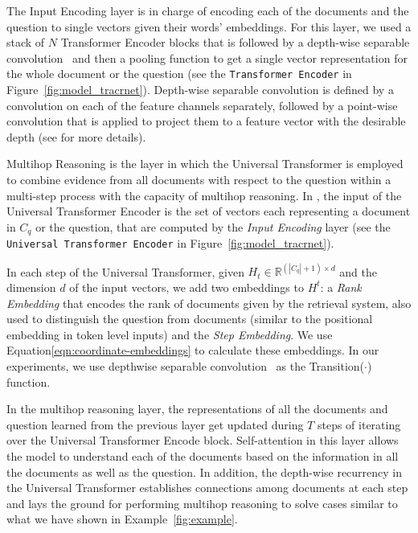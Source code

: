 The Input Encoding layer is in charge of encoding each of the documents and the question to single vectors given their words' embeddings. For this layer, we used a stack of $N$ Transformer Encoder blocks that is followed by a depth-wise separable convolution~\citep{kaiser2017depthwise,chollet2017xception} and then a pooling function to get a single vector representation for the whole document or the question  (see the \texttt{Transformer Encoder} in Figure~\ref{fig:model_tracrnet}). 
Depth-wise separable convolution is defined by a convolution on each of the feature channels separately, followed by a point-wise convolution that is applied to project them to a feature vector with the desirable depth (see \citep{chollet2017xception} for more details).

Multihop Reasoning is the layer in which the Universal Transformer is employed to combine evidence from all documents with respect to the question within a multi-step process with the capacity of multihop reasoning.
%
In \tracrnet, the input of the Universal Transformer Encoder is the set of vectors each representing a document in $C_q$ or the question, that are computed by the \emph{Input Encoding} layer  (see  the \texttt{Universal Transformer Encoder} in Figure~\ref{fig:model_tracrnet}). 

In each step of the Universal Transformer, given $H_{t} \in \mathbb{R}^{(|C_q|+1) \times d}$ and the dimension $d$ of the input vectors, we add two embeddings to $H^{t}$: a \emph{Rank Embedding} that encodes the rank of documents given by the retrieval system, also used to distinguish the question from documents (similar to the positional embedding in token level inputs) and the \emph{Step Embedding}. We use Equation\ref{eqn:coordinate-embeddings} to calculate these embeddings.
In our experiments, we use depthwise separable convolution~\cite{chollet2017xception} as the Transition($\cdot$) function.

In the multihop reasoning layer, the representations of all the documents and question learned from the previous layer get updated during $T$ steps of iterating over the Universal Transformer Encode block. 
Self-attention in this layer allows the model to understand each of the documents based on the information in all the documents as well as the question.
In addition, the depth-wise recurrency in the Universal Transformer establishes connections among documents at each step and lays the ground for performing multihop reasoning to solve cases similar to what we have shown in Example~\ref{fig:example}.

